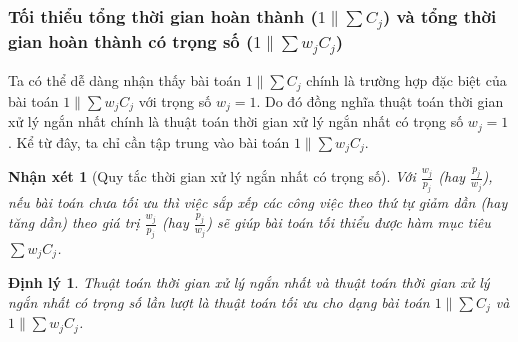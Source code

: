 \documentclass[12pt,a4paper]{report}
\newtheorem{dl}{Định lý}
\newtheorem{nx}{Nhận xét}
\begin{document}
\subsubsection*{Tối thiểu tổng thời gian hoàn thành ($1 \| \sum C_j$) và tổng thời gian hoàn thành có trọng số ($1 \| \sum w_j C_j$)}
Ta có thể dễ dàng nhận thấy bài toán $1 \| \sum C_j$ chính là trường hợp đặc biệt của bài toán $1 \| \sum w_j C_j$ với trọng số $w_j=1$. Do đó đồng nghĩa thuật toán thời gian xử lý ngắn nhất chính là thuật toán thời gian xử lý ngắn nhất có trọng số $w_j=1$. Kể từ đây, ta chỉ cần tập trung vào bài toán $1\| \sum w_j C_j$.

\begin{nx}[Quy tắc thời gian xử lý ngắn nhất có trọng số]
Với $\frac{w_j}{p_j}$ (hay $\frac{p_j}{w_j}$), nếu bài toán chưa tối ưu thì việc sắp xếp các công việc theo thứ tự giảm dần (hay tăng dần) theo giá trị $\frac{w_j}{p_j}$ (hay $\frac{p_j}{w_j}$) sẽ giúp bài toán tối thiểu được hàm mục tiêu $\sum w_j C_j$.
\end{nx}

\begin{dl}
	Thuật toán thời gian xử lý ngắn nhất và thuật toán thời gian xử lý ngắn nhất có trọng số lần lượt là thuật toán tối ưu cho dạng bài toán $1 \| \sum C_j$ và $1 \| \sum w_j C_j$.
\end{dl}
\end{document}

